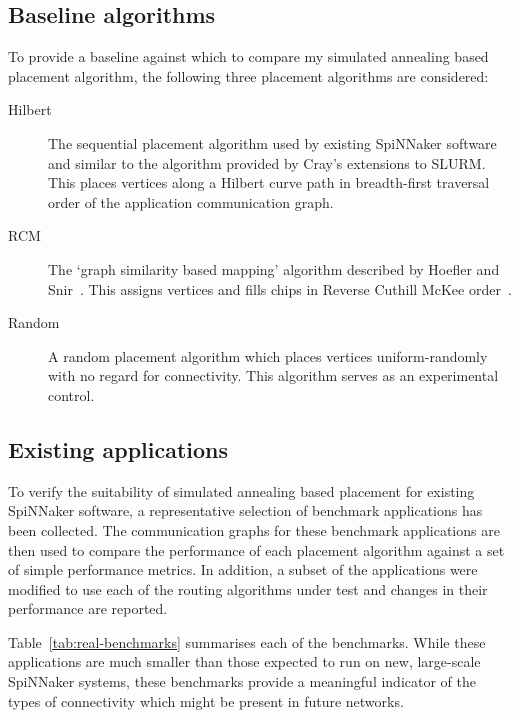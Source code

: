 		\subsection{Baseline algorithms}
			
			To provide a baseline against which to compare my simulated annealing
			based placement algorithm, the following three placement algorithms are
			considered:
			
			\begin{description}
				
				\item[Hilbert] The sequential placement algorithm used by existing
				SpiNNaker software and similar to the algorithm provided by Cray's
				extensions to SLURM. This places vertices along a Hilbert curve path in
				breadth-first traversal order of the application communication graph.
				
				\item[RCM] The `graph similarity based mapping' algorithm described by
				Hoefler and Snir~\cite{hoefler11}. This assigns vertices and fills
				chips in Reverse Cuthill McKee order~\cite{cuthill69}.
				
				\item[Random] A random placement algorithm which places vertices
				uniform-randomly with no regard for connectivity. This algorithm serves
				as an experimental control.
				
			\end{description}
			
		\subsection{Existing applications}
			
			\label{sec:existing-applications}
			
			To verify the suitability of simulated annealing based placement for
			existing SpiNNaker software, a representative selection of benchmark
			applications has been collected. The communication graphs for these
			benchmark applications are then used to compare the performance of each
			placement algorithm against a set of simple performance metrics. In
			addition, a subset of the applications were modified to use each of the
			routing algorithms under test and changes in their performance are
			reported.
			
			Table~\ref{tab:real-benchmarks} summarises each of the benchmarks. While
			these applications are much smaller than those expected to run on new,
			large-scale SpiNNaker systems, these benchmarks provide a meaningful
			indicator of the types of connectivity which might be present in future
			networks.
			
